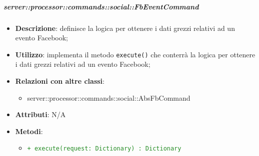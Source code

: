         \subparagraph{server::processor::commands::social::FbEventCommand} %
        \label{subp:bdsm_app_server_processor_commands_social_fbeventcommand}
        \begin{itemize}
          \item \textbf{Descrizione}: definisce la logica per ottenere i dati grezzi relativi ad un evento Facebook;
          \item \textbf{Utilizzo}: implementa il metodo \texttt{execute()} che conterrà la logica per ottenere i dati grezzi relativi ad un evento Facebook;
          \item \textbf{Relazioni con altre classi}:
            \begin{itemize}
              \item server::processor::commands::social::AbsFbCommand
            \end{itemize}
            \item \textbf{Attributi}: N/A
            \item \textbf{Metodi}:
            \begin{itemize}
                \item \textcolor{forestgreen}{\texttt{+ execute(request: Dictionary) : Dictionary}}
            \end{itemize}
        \end{itemize}

